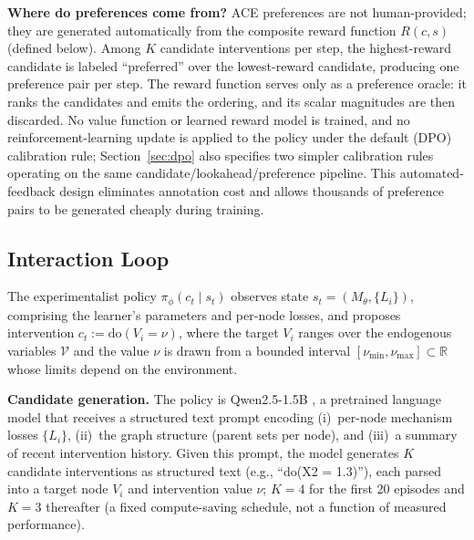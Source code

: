 \documentclass{article}
\theoremstyle{plain}
\theoremstyle{definition}
\theoremstyle{remark}
\begin{document}
\textbf{Where do preferences come from?} ACE preferences are not human-provided; they are generated automatically from the composite reward function $R(c, s)$ (defined below). Among $K$ candidate interventions per step, the highest-reward candidate is labeled ``preferred'' over the lowest-reward candidate, producing one preference pair per step. The reward function serves only as a preference oracle: it ranks the candidates and emits the ordering, and its scalar magnitudes are then discarded. No value function or learned reward model is trained, and no reinforcement-learning update is applied to the policy under the default (DPO) calibration rule; Section~\ref{sec:dpo} also specifies two simpler calibration rules operating on the same candidate/lookahead/preference pipeline. This automated-feedback design eliminates annotation cost and allows thousands of preference pairs to be generated cheaply during training.

\subsection{Interaction Loop}
\label{sec:interaction-loop}

The experimentalist policy $\pi_\phi(c_t \mid s_t)$ observes state $s_t = (M_\theta, \{L_i\})$, comprising the learner's parameters and per-node losses, and proposes intervention $c_t := \text{do}(V_i = \nu)$, where the target $V_i$ ranges over the endogenous variables $\mathcal{V}$ and the value $\nu$ is drawn from a bounded interval $[\nu_{\min}, \nu_{\max}] \subset \mathbb{R}$ whose limits depend on the environment.

\textbf{Candidate generation.} The policy is Qwen2.5-1.5B \citep{qwen2_5}, a pretrained language model that receives a structured text prompt encoding (i)~per-node mechanism losses $\{L_i\}$, (ii)~the graph structure (parent sets per node), and (iii)~a summary of recent intervention history. Given this prompt, the model generates $K$ candidate interventions as structured text (e.g., ``do(X2 = 1.3)''), each parsed into a target node $V_i$ and intervention value $\nu$; $K{=}4$ for the first 20 episodes and $K{=}3$ thereafter (a fixed compute-saving schedule, not a function of measured performance).
\end{document}
